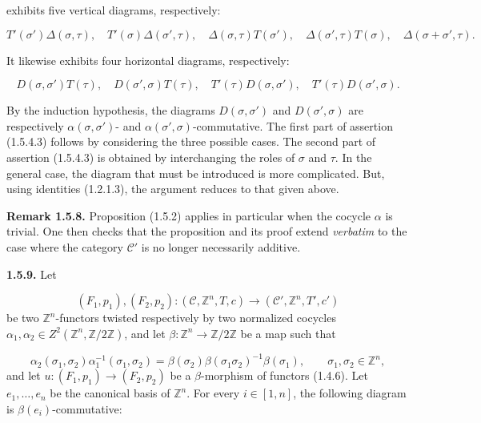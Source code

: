 %
exhibits five vertical diagrams, respectively:

\[
  T'(\sigma')\Delta(\sigma,\tau),\quad
  T'(\sigma)\Delta(\sigma',\tau),\quad
  \Delta(\sigma,\tau)T(\sigma'),\quad
  \Delta(\sigma',\tau)T(\sigma),\quad
  \Delta(\sigma+\sigma',\tau).
\]

It likewise exhibits four horizontal diagrams, respectively:

\[
  D(\sigma,\sigma')T(\tau),\quad
  D(\sigma',\sigma)T(\tau),\quad
  T'(\tau)D(\sigma,\sigma'),\quad
  T'(\tau)D(\sigma',\sigma).
\]

By the induction hypothesis, the diagrams $D(\sigma,\sigma')$ and
$D(\sigma',\sigma)$ are respectively $\alpha(\sigma,\sigma')$- and
$\alpha(\sigma',\sigma)$-commutative. The first part of assertion
(1.5.4.3) follows by considering the three possible cases. The second
part of assertion (1.5.4.3) is obtained by interchanging the roles of
$\sigma$ and $\tau$. In the general case, the diagram that must be
introduced is more complicated. But, using identities (1.2.1.3), the
argument reduces to that given above.

\noindent\textbf{Remark 1.5.8.}\quad
Proposition (1.5.2) applies in particular when the cocycle $\alpha$ is
trivial. One then checks that the proposition and its proof extend
\emph{verbatim} to the case where the category $\mathcal C'$ is no
longer necessarily additive.

\noindent\textbf{1.5.9.}\quad
Let

\[
  (F_1,p_1),(F_2,p_2)\colon
  (\mathcal C,\mathbb Z^n,T,c)
  \longrightarrow
  (\mathcal C',\mathbb Z^n,T',c')
\]
be two $\mathbb Z^n$-functors twisted respectively by two normalized
cocycles $\alpha_1,\alpha_2\in
Z^2(\mathbb Z^n,\mathbb Z/2\mathbb Z)$, and let
$\beta\colon\mathbb Z^n\to\mathbb Z/2\mathbb Z$ be a map such that

\begin{equation}
  \alpha_2(\sigma_1,\sigma_2)\alpha_1^{-1}(\sigma_1,\sigma_2)
  =\beta(\sigma_2)\beta(\sigma_1\sigma_2)^{-1}\beta(\sigma_1),
  \qquad \sigma_1,\sigma_2\in\mathbb Z^n,
  \tag{1.5.9.1}
\end{equation}
and let $u\colon(F_1,p_1)\to(F_2,p_2)$ be a $\beta$-morphism of
functors (1.4.6). Let $e_1,\ldots,e_n$ be the canonical basis of
$\mathbb Z^n$. For every $i\in[1,n]$, the following diagram is
$\beta(e_i)$-commutative:

